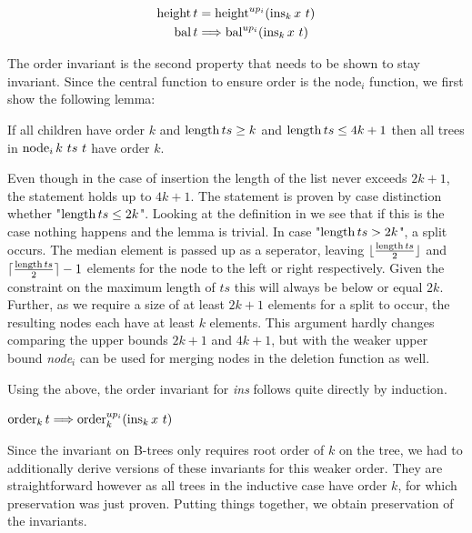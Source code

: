 \begin{lemma}
    \begin{align*}
    \operatorname{height} t & = \operatorname{height}^{up_i} (\operatorname{ins}_k x\ t) \\
    \operatorname{bal} t & \Longrightarrow \operatorname{bal}^{up_i} (\operatorname{ins}_k x\ t)
    \end{align*}
\end{lemma}

The order invariant is the second property that needs
to be shown to stay invariant.
Since the central function to ensure order is the node$_i$ function,
we first show the following lemma:

\begin{lemma}
\label{lem:nodei-order}
    If all children have order $k$ and $\operatorname{length} ts \ge k$ and $\operatorname{length} ts \le 4k+1$
    then all trees in $\operatorname{node}_i k\ ts\ t$ have order $k$.
\end{lemma}

Even though in the case of insertion the length of the list
never exceeds $2k+1$, the statement holds up to $4k+1$.
The statement is proven by case distinction whether "$\operatorname{length} ts \le 2k$".
Looking at the definition in 
we see that if this is the case nothing happens and the lemma is trivial.
In case "$\operatorname{length} ts > 2k$", a split occurs.
The median element is passed up as a seperator, leaving
$\lfloor\frac{\operatorname{length} ts}{2}\rfloor$ and $\lceil\frac{\operatorname{length} ts}{2}\rceil - 1$
elements for the node to the left or right respectively.
Given the constraint on the maximum length of $ts$
this will always be below or equal $2k$.
Further, as we require a size of at least $2k+1$ elements for a split to occur,
the resulting nodes each have at least $k$ elements.
This argument hardly changes comparing the upper bounds $2k+1$ and $4k+1$,
but with the weaker upper bound \textit{node}$_i$ can be used for merging nodes
in the deletion function as well.

Using the above, the order invariant for \textit{ins}
follows quite directly by induction.

\begin{lemma}
    $\operatorname{order}_k t \Longrightarrow \operatorname{order}^{up_i}_k (\operatorname{ins}_k x\ t)$
\end{lemma}

Since the invariant on B-trees only requires root order of $k$ on the
tree, we had to additionally derive versions of
these invariants for this weaker order.
They are straightforward however as all trees in the inductive case
have order $k$, for which preservation was just proven.
Putting things together, we obtain preservation of the invariants.

